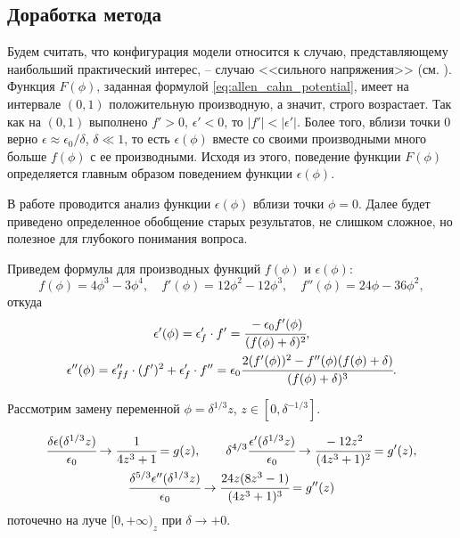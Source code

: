 \subsection{Доработка метода}

Будем считать, что конфигурация модели относится к случаю, представляющему наибольший практический интерес, -- случаю <<сильного напряжения>> (см. \cite{ponomarev_stability}). Функция $F(\phi)$, заданная формулой \eqref{eq:allen_cahn_potential}, имеет на интервале $(0, 1)$ положительную производную, а значит, строго возрастает. Так как на $(0, 1)$ выполнено $f' > 0$, $\epsilon' < 0$, то $|f'| < |\epsilon'|$. Более того, вблизи точки $0$ верно $\epsilon \approx \epsilon_0 / \delta$, $\delta \ll 1$, то есть $\epsilon(\phi)$ вместе со своими производными много больше $f(\phi)$ с ее производными. Исходя из этого, поведение функции $F(\phi)$ определяется главным образом поведением функции $\epsilon(\phi)$.

В работе \cite{ponomarev_stability} проводится анализ функции $\epsilon(\phi)$ вблизи точки $\phi = 0$. Далее будет приведено определенное обобщение старых результатов, не слишком сложное, но полезное для глубокого понимания вопроса.

Приведем формулы для производных функций $f(\phi)$ и $\epsilon(\phi)$:
\[
	f(\phi) = 4 \phi^3 - 3 \phi^4, \quad f'(\phi) = 12 \phi^2 - 12 \phi^3, \quad f''(\phi) = 24 \phi - 36 \phi^2,
\]
откуда
\begin{gather}
	\epsilon'(\phi) = \epsilon'_f \cdot f' = \cfrac{-\epsilon_0 f'(\phi)}{(f(\phi) + \delta)^2},
	\label{eq:epsilon_phi} \\
	\epsilon''(\phi) = \epsilon''_{ff} \cdot (f')^2 + \epsilon'_f \cdot f'' = \epsilon_0 \cfrac{2 (f'(\phi))^2 - f''(\phi)(f(\phi) + \delta)}{(f(\phi) + \delta)^3}.
	\label{eq:epsilon_phi_phi}
\end{gather}

Рассмотрим замену переменной $\phi = \delta^{1/3} z$, $z \in [0, \delta^{-1/3}]$.

\begin{proposition}
	\label{prop:convergence}
	\begin{gather*}
		\cfrac{\delta \epsilon(\delta^{1/3} z)}{\epsilon_0} \to \cfrac{1}{4 z^3 + 1} = g(z), \qquad \delta^{4/3} \cfrac{\epsilon'(\delta^{1/3} z)}{\epsilon_0} \to \cfrac{-12 z^2}{(4 z^3 + 1)^2} = g'(z), \\
		\cfrac{\delta^{5/3} \epsilon''(\delta^{1/3} z)}{\epsilon_0} \to \cfrac{24z (8 z^3 - 1)}{(4 z^3 + 1)^3} = g''(z)
	\end{gather*}
	поточечно на луче $[0, +\infty)_z$ при $\delta \to +0$.
\end{proposition}

